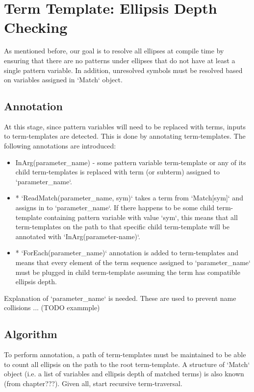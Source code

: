 \section{Term Template: Ellipsis Depth Checking}

As mentioned before, our goal is to resolve all ellipses at compile time by ensuring that there are no patterns under ellipses that do not have at least a single pattern variable. In addition, unresolved symbols must be resolved based on variables assigned in `Match` object. 

\subsection{Annotation}
At this stage, since pattern variables will need to be replaced with terms, inputs to term-templates are detected. This is done by annotating term-templates. The following annotations are introduced:

\begin{itemize}
\item
InArg(parameter\_name) - some pattern variable term-template or any of its child term-templates is replaced with term (or subterm) assigned to `parameter\_name`. 
\item
* `ReadMatch(parameter\_name, sym)` takes a term from `Match[sym]` and assigns in to `parameter\_name`. If there happens to be some child term-template containing pattern variable with value `sym`, this means that all term-templates on the path to that specific child term-template will be annotated with `InArg(parameter-name)`.
\item
* `ForEach(parameter\_name)` annotation is added to \TermRepeat term-templates and means that every element of the term sequence assigned to `parameter\_name` must be plugged in child term-template assuming the term has compatible ellipsis depth.
\end{itemize}

Explanation of `parameter\_name` is needed. These are used to prevent name collisions ... (TODO exammple)

\subsection{Algorithm}

To perform annotation, a path of term-templates must be maintained to be able to count all ellipsis on the path to the root term-template. A structure of `Match` object (i.e. a list of variables and ellipsis depth of matched terms) is also known (from chapter???). Given all, start recursive term-traversal.

